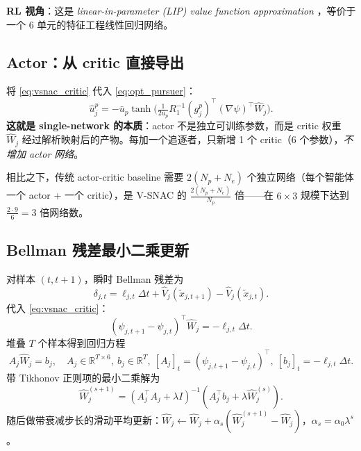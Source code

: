 \documentclass[11pt,a4paper]{article}
\newcommand{\R}{\mathbb{R}}
\newcommand{\ubar}{\bar{u}}
\theoremstyle{remark}
\begin{document}
\textbf{RL 视角}：这是 \emph{linear-in-parameter (LIP) value function approximation} \cite{lewis2009adaptive}，等价于一个 6 单元的特征工程线性回归网络。

\subsection{Actor：从 critic 直接导出}

将 \eqref{eq:vsnac_critic} 代入 \eqref{eq:opt_pursuer}：
\begin{equation}
\hat u_j^p = -\ubar_p\tanh\!\Big(\tfrac{1}{2\ubar_p}R_1^{-1}(g_j^p)^\top(\nabla\psi)^\top\hat W_j\Big).
\label{eq:vsnac_actor}
\end{equation}
\textbf{这就是 single-network 的本质}：actor 不是独立可训练参数，而是 critic 权重 $\hat W_j$ 经过解析映射后的产物。每加一个追逐者，只新增 1 个 critic（6 个参数），\emph{不增加 actor 网络}。

相比之下，传统 actor-critic baseline 需要 $2(N_p+N_e)$ 个独立网络（每个智能体一个 actor + 一个 critic），是 V-SNAC 的 $\frac{2(N_p+N_e)}{N_p}$ 倍——在 $6\!\times\!3$ 规模下达到 $\frac{2\cdot 9}{6}=3$ 倍网络数。

\subsection{Bellman 残差最小二乘更新}

对样本 $(t,t+1)$，瞬时 Bellman 残差为
\begin{equation}
\delta_{j,t}=\ell_{j,t}\Delta t+\hat V_j(\tilde x_{j,t+1})-\hat V_j(\tilde x_{j,t}).
\label{eq:td_residual}
\end{equation}
代入 \eqref{eq:vsnac_critic}：
\begin{equation}
(\psi_{j,t+1}-\psi_{j,t})^\top\hat W_j = -\ell_{j,t}\Delta t.
\end{equation}
堆叠 $T$ 个样本得到回归方程
\begin{equation}
A_j\hat W_j=b_j,\quad
A_j\in\R^{T\times 6},\
b_j\in\R^T,\
[A_j]_t=(\psi_{j,t+1}-\psi_{j,t})^\top,\
[b_j]_t=-\ell_{j,t}\Delta t.
\label{eq:regression}
\end{equation}
带 Tikhonov 正则项的最小二乘解为
\begin{equation}
\hat W_j^{(s+1)}=(A_j^\top A_j+\lambda I)^{-1}(A_j^\top b_j+\lambda \hat W_j^{(s)}).
\label{eq:ls_update}
\end{equation}
随后做带衰减步长的滑动平均更新：$\hat W_j\leftarrow \hat W_j+\alpha_s(\hat W_j^{(s+1)}-\hat W_j)$，$\alpha_s=\alpha_0\lambda^s$。
\end{document}
